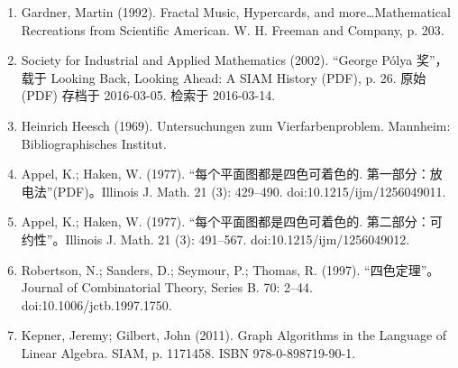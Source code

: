 \begin{enumerate}
\item Gardner, Martin (1992). Fractal Music, Hypercards, and more…Mathematical Recreations from Scientific American. W. H. Freeman and Company, p. 203.
\item Society for Industrial and Applied Mathematics (2002). “George Pólya 奖”，载于 Looking Back, Looking Ahead: A SIAM History (PDF), p. 26. 原始 (PDF) 存档于 2016-03-05. 检索于 2016-03-14.
\item Heinrich Heesch (1969). Untersuchungen zum Vierfarbenproblem. Mannheim: Bibliographisches Institut.
\item Appel, K.; Haken, W. (1977). “每个平面图都是四色可着色的. 第一部分：放电法”(PDF)。Illinois J. Math. 21 (3): 429–490. doi:10.1215/ijm/1256049011.
\item Appel, K.; Haken, W. (1977). “每个平面图都是四色可着色的. 第二部分：可约性”。Illinois J. Math. 21 (3): 491–567. doi:10.1215/ijm/1256049012.
\item Robertson, N.; Sanders, D.; Seymour, P.; Thomas, R. (1997). “四色定理”。Journal of Combinatorial Theory, Series B. 70: 2–44. doi:10.1006/jctb.1997.1750.
\item Kepner, Jeremy; Gilbert, John (2011). Graph Algorithms in the Language of Linear Algebra. SIAM, p. 1171458. ISBN 978-0-898719-90-1.
\end{enumerate}
